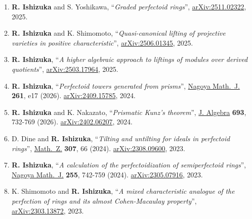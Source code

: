\documentclass[10pt,a4paper,sans]{moderncv}
\begin{document}
\begin{enumerate}
  \item[8.] \textbf{R. Ishizuka} and S. Yoshikawa, ``\emph{Graded perfectoid rings}'', \href{https://arxiv.org/abs/2511.02322}{arXiv:2511.02322}, 2025.

  \item[7.] \textbf{R. Ishizuka} and K. Shimomoto,  ``\emph{Quasi-canonical lifting of projective varieties in positive characteristic}'', \href{https://arxiv.org/abs/2506.01345}{arXiv:2506.01345}, 2025.

  \item[6.] \textbf{R. Ishizuka}, ``\emph{A higher algebraic approach to liftings of modules over derived quotients}'', \href{https://arxiv.org/abs/2503.17964}{arXiv:2503.17964}, 2025.

  \item[5.] \textbf{R. Ishizuka}, ``\emph{Perfectoid towers generated from prisms}'', \href{https://doi.org/10.1017/nmj.2026.10101}{Nagoya Math.\ J.} \textbf{261}, e17 (2026). \href{https://arxiv.org/abs/2409.15785}{arXiv:2409.15785}, 2024.

  \item[4.] \textbf{R. Ishizuka} and K. Nakazato, ``\emph{Prismatic Kunz's theorem}'', \href{https://doi.org/10.1016/j.jalgebra.2026.01.010}{J. Algebra} \textbf{693}, 732-769 (2026). \href{https://arxiv.org/abs/2402.06207}{arXiv:2402.06207}, 2024.

  \item[3.] D. Dine and \textbf{R. Ishizuka}, ``\emph{Tilting and untilting for ideals in perfectoid rings}'', \href{https://doi.org/10.1007/s00209-024-03537-1}{Math.\ Z.} \textbf{307}, 66 (2024). \href{https://arxiv.org/abs/2308.09600}{arXiv:2308.09600}, 2023.

  \item[2.] \textbf{R. Ishizuka}, ``\emph{A calculation of the perfectoidization of semiperfectoid rings}'', \href{https://doi.org/10.1017/nmj.2024.2}{Nagoya Math.\ J.} \textbf{255}, 742-759 (2024). \href{https://arxiv.org/abs/2305.07916}{arXiv:2305.07916}, 2023.

  \item[1.] K. Shimomoto and \textbf{R. Ishizuka}, ``\emph{A mixed characteristic analogue of the perfection of rings and its almost Cohen-Macaulay property}'', \href{https://arxiv.org/abs/2303.13872}{arXiv:2303.13872}, 2023.
\end{enumerate}


\end{document}
